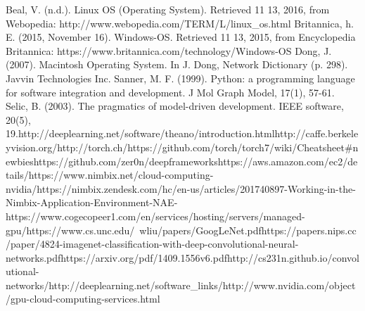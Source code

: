 \documentclass{scrreprt}
\begin{document}
Beal, V. (n.d.). Linux OS (Operating System). Retrieved 11 13, 2016, from Webopedia:
http://www.webopedia.com/TERM/L/linux_os.html\newline
Britannica, h. E. (2015, November 16). Windows-OS. Retrieved 11 13, 2015, from Encyclopedia
Britannica: https://www.britannica.com/technology/Windows-OS\newline
Dong, J. (2007). Macintosh Operating System. In J. Dong, Network Dictionary (p. 298). Javvin
Technologies Inc.\newline
Sanner, M. F. (1999). Python: a programming language for software integration and	development. J Mol Graph Model, 17(1), 57-61.\newline
Selic, B. (2003). The pragmatics of model-driven development. IEEE software, 20(5), 19.\newline
[1] http://deeplearning.net/software/theano/introduction.html\newline
[2] http://caffe.berkeleyvision.org/\newline
[3] http://torch.ch/\newline
[4] https://github.com/torch/torch7/wiki/Cheatsheet\#newbies\newline
[5] https://github.com/zer0n/deepframeworks\newline
[6] https://aws.amazon.com/ec2/details/\newline
[7] https://www.nimbix.net/cloud-computing-nvidia/\newline
[8] https://nimbix.zendesk.com/hc/en-us/articles/201740897-Working-in-the-Nimbix-Application-Environment-NAE-\newline
[9] https://www.cogecopeer1.com/en/services/hosting/servers/managed-gpu/\newline
[10] https://www.cs.unc.edu/~wliu/papers/GoogLeNet.pdf\newline
[11] https://papers.nips.cc/paper/4824-imagenet-classification-with-deep-convolutional-neural-networks.pdf\newline
[12] https://arxiv.org/pdf/1409.1556v6.pdf\newline
[13] http://cs231n.github.io/convolutional-networks/\newline
[14] http://deeplearning.net/software_links/\newline
[15] http://www.nvidia.com/object/gpu-cloud-computing-services.html\newline
\end{document}
